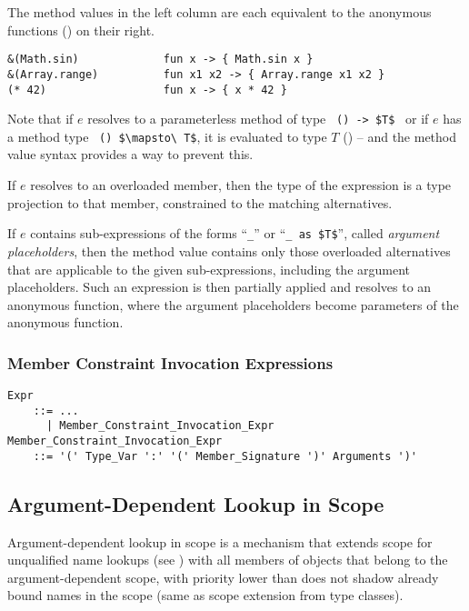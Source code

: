\example The method values in the left column are each equivalent to the anonymous functions () on their right. 
\begin{lstlisting}[deletekeywords={range}]
&(Math.sin)             fun x -> { Math.sin x }
&(Array.range)          fun x1 x2 -> { Array.range x1 x2 }
(* 42)                  fun x -> { x * 42 }
\end{lstlisting}

Note that if $e$ resolves to a parameterless method of type ~\lstinline!() -> $T$!~ or if $e$ has a method type ~\lstinline!() $\mapsto\ T$!, it is evaluated to type $T$ () -- and the method value syntax provides a way to prevent this. 

If $e$ resolves to an overloaded member, then the type of the expression is a type projection to that member, constrained to the matching alternatives. 

If $e$ contains sub-expressions of the forms ``\lstinline!_!'' or ``\lstinline!_ as $T$!'', called {\em argument placeholders}, then the method value contains only those overloaded alternatives that are applicable to the given sub-expressions, including the argument placeholders. Such an expression is then partially applied and resolves to an anonymous function, where the argument placeholders become parameters of the anonymous function. 





\subsubsection{Member Constraint Invocation Expressions}

\grammar\begin{lstlisting}
Expr
    ::= ...
      | Member_Constraint_Invocation_Expr
Member_Constraint_Invocation_Expr
    ::= '(' Type_Var ':' '(' Member_Signature ')' Arguments ')'
\end{lstlisting}





\subsection{Argument-Dependent Lookup in Scope}
\label{sec:adl-scope}

Argument-dependent lookup in scope is a mechanism that extends scope for unqualified name lookups (see ) with all members of objects that belong to the argument-dependent scope, with priority lower than does not shadow already bound names in the scope (same as scope extension from type classes).  

